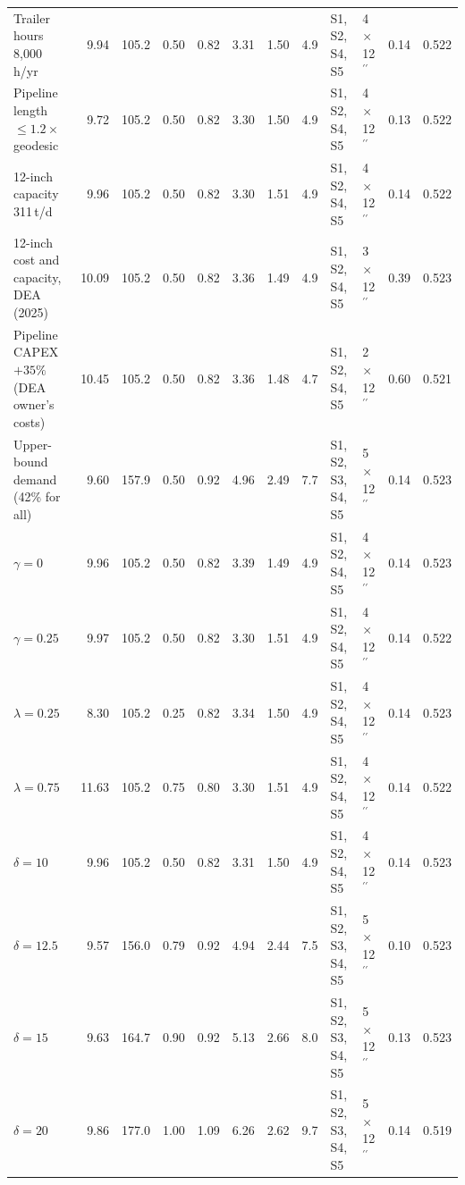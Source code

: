 \documentclass[preprint,12pt,authoryear]{elsarticle}
\begin{document}
\begin{table}[htbp]
{\begin{tabular}{lrrrrrrrllrr}
Trailer hours 8,000\,h/yr & 9.94 & 105.2 & 0.50 & 0.82 & 3.31 & 1.50 & 4.9 & S1, S2, S4, S5 & 4$\times$12$^{\prime\prime}$ & 0.14 & 0.522 \\
Pipeline length $\le 1.2\times$ geodesic & 9.72 & 105.2 & 0.50 & 0.82 & 3.30 & 1.50 & 4.9 & S1, S2, S4, S5 & 4$\times$12$^{\prime\prime}$ & 0.13 & 0.522 \\
12-inch capacity 311\,t/d & 9.96 & 105.2 & 0.50 & 0.82 & 3.30 & 1.51 & 4.9 & S1, S2, S4, S5 & 4$\times$12$^{\prime\prime}$ & 0.14 & 0.522 \\
12-inch cost and capacity, DEA (2025) & 10.09 & 105.2 & 0.50 & 0.82 & 3.36 & 1.49 & 4.9 & S1, S2, S4, S5 & 3$\times$12$^{\prime\prime}$ & 0.39 & 0.523 \\
Pipeline CAPEX $+35\%$ (DEA owner's costs) & 10.45 & 105.2 & 0.50 & 0.82 & 3.36 & 1.48 & 4.7 & S1, S2, S4, S5 & 2$\times$12$^{\prime\prime}$ & 0.60 & 0.521 \\
Upper-bound demand (42\% for all) & 9.60 & 157.9 & 0.50 & 0.92 & 4.96 & 2.49 & 7.7 & S1, S2, S3, S4, S5 & 5$\times$12$^{\prime\prime}$ & 0.14 & 0.523 \\
$\gamma = 0$ & 9.96 & 105.2 & 0.50 & 0.82 & 3.39 & 1.49 & 4.9 & S1, S2, S4, S5 & 4$\times$12$^{\prime\prime}$ & 0.14 & 0.523 \\
$\gamma = 0.25$ & 9.97 & 105.2 & 0.50 & 0.82 & 3.30 & 1.51 & 4.9 & S1, S2, S4, S5 & 4$\times$12$^{\prime\prime}$ & 0.14 & 0.522 \\
$\lambda = 0.25$ & 8.30 & 105.2 & 0.25 & 0.82 & 3.34 & 1.50 & 4.9 & S1, S2, S4, S5 & 4$\times$12$^{\prime\prime}$ & 0.14 & 0.523 \\
$\lambda = 0.75$ & 11.63 & 105.2 & 0.75 & 0.80 & 3.30 & 1.51 & 4.9 & S1, S2, S4, S5 & 4$\times$12$^{\prime\prime}$ & 0.14 & 0.522 \\
$\delta = 10$ & 9.96 & 105.2 & 0.50 & 0.82 & 3.31 & 1.50 & 4.9 & S1, S2, S4, S5 & 4$\times$12$^{\prime\prime}$ & 0.14 & 0.523 \\
$\delta = 12.5$ & 9.57 & 156.0 & 0.79 & 0.92 & 4.94 & 2.44 & 7.5 & S1, S2, S3, S4, S5 & 5$\times$12$^{\prime\prime}$ & 0.10 & 0.523 \\
$\delta = 15$ & 9.63 & 164.7 & 0.90 & 0.92 & 5.13 & 2.66 & 8.0 & S1, S2, S3, S4, S5 & 5$\times$12$^{\prime\prime}$ & 0.13 & 0.523 \\
$\delta = 20$ & 9.86 & 177.0 & 1.00 & 1.09 & 6.26 & 2.62 & 9.7 & S1, S2, S3, S4, S5 & 5$\times$12$^{\prime\prime}$ & 0.14 & 0.519 \\
\bottomrule
\end{tabular}%
}
\end{table}
\end{document}
